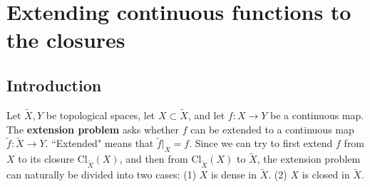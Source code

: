 \documentclass[12pt,b5paper,notitlepage]{article}
\theoremstyle{definition}
\theoremstyle{plain}
\newcommand{\wtd}{\widetilde}
\newcommand{\Zbb}{\mathbb Z}
\newcommand{\Rbb}{\mathbb R}
\newcommand{\dps}{\displaystyle}
\newcommand{\Cl}{\mathrm{Cl}}
\numberwithin{equation}{section}
\begin{document}
\begin{comment}


Let $g_n:[0,1]\rightarrow\Rbb$ be $g_n(x)=n^{-1}x^n$ if $n\neq0$. Equip $\Zbb^\times=\Zbb\setminus\{0\}$ with the usual order $\leq$. Then $(g_n)_{n\in\Zbb^\times}$ is a net of continuous functions converging pointwise to $0$, and is decreasing over $n$ when  $n\in\Zbb_+$.  Thus, by Pb. \ref{lb285}, for every $x\in[0,1]$, we have $\dps\lim_{(n,p)\rightarrow(+\infty,x)
}g_n(p)=g(x)$. Clearly $(g_n)_{n\in\Zbb^\times}$ converges uniformly to $0$. However, it is not hard to check that this net of functions is not equicontinuous. (The bad thing happens when $n<0$.) 


These examples indicate why condition (1) of Thm. \ref{lb277} or (1') of Prop. \ref{lb281} is more natural than ``equicontinuity + pointwise convergence": Condition (1') of Prop. \ref{lb281} can be viewed as a continuity condition which is not ``equi" over all $\alpha$ in the index set $I$, but is ``equi" for sufficiently large $\alpha$.
\end{comment}

















\newpage


\section{Extending continuous functions to the closures}



\subsection{Introduction}

Let $\wtd X,Y$ be topological spaces, let $X\subset \wtd X$, and let $f:X\rightarrow Y$ be a continuous map. The \textbf{extension problem} asks whether $f$ can be extended to a continuous map $\wtd f:\wtd X\rightarrow Y$. ``Extended" means that $\wtd f|_X=f$.  Since we can try to first extend $f$ from $X$ to its closure $\Cl_{\wtd X}(X)$, and then from $\Cl_{\wtd X}(X)$ to $\wtd X$, the extension problem can naturally be divided into two cases: (1) $X$ is dense in $\wtd X$. (2) $X$ is closed in $\wtd X$.
\end{document}
